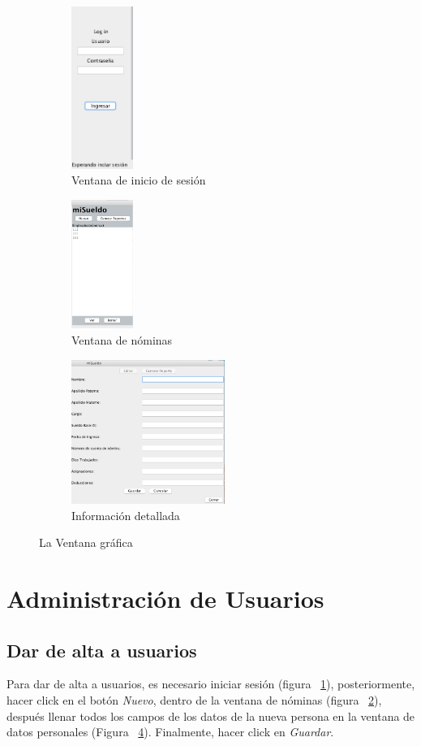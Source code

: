 \documentclass[12pt]{amsart}
\begin{document}
\begin{figure}[h]
	\begin{subfigure}{0.5\textwidth}
	\includegraphics[width=20mm]{Login.jpg}
	\caption{Ventana de inicio de sesi\'on}
	\label{fig:Login}
	\end{subfigure}
	\begin{subfigure}{0.5\textwidth}
	\includegraphics[width=20mm]{sueldo.png}
	\caption{Ventana de n\'ominas}
	\label{fig:sueldo}
	\end{subfigure}
	\begin{subfigure}{0.5\textwidth}
	\includegraphics[width=50mm]{info.jpg}
	\caption{Informaci\'on detallada}
	\label{fig:Info}
	\end{subfigure}
	\caption{La Ventana gr\'afica}
\end{figure}

\section{Administraci\'on de Usuarios}
\subsection{Dar de alta a usuarios}
{Para dar de alta a usuarios, es necesario iniciar sesi\'on (figura ~\ref{fig:Login}), posteriormente, hacer click en el bot\'on \textit{Nuevo}, dentro de la ventana de n\'ominas (figura ~\ref{fig:sueldo}), despu\'es llenar todos los campos de los datos de la nueva persona en la ventana de datos personales (Figura ~\ref{fig:Info}). Finalmente, hacer click en \textit{Guardar}. }
\end{document}
